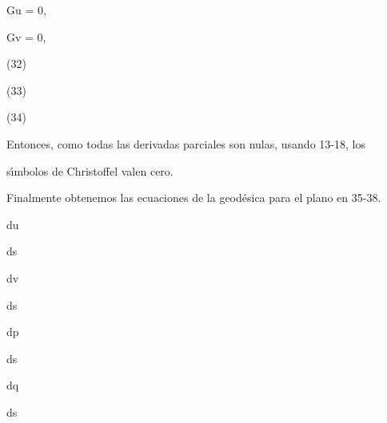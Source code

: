 \documentclass[a4paper,portrait,12pt]{article}
\begin{document}
\begin{flushleft}
Gu = 0,
\end{flushleft}


\begin{flushleft}
Gv = 0,
\end{flushleft}





(32)


(33)


(34)





\begin{flushleft}
Entonces, como todas las derivadas parciales son nulas, usando 13-18, los
\end{flushleft}


\begin{flushleft}
s\i{}́mbolos de Christoffel valen cero.
\end{flushleft}


\begin{flushleft}
Finalmente obtenemos las ecuaciones de la geodésica para el plano en 35-38.
\end{flushleft}


\begin{flushleft}
du
\end{flushleft}


\begin{flushleft}
ds
\end{flushleft}


\begin{flushleft}
dv
\end{flushleft}


\begin{flushleft}
ds
\end{flushleft}


\begin{flushleft}
dp
\end{flushleft}


\begin{flushleft}
ds
\end{flushleft}


\begin{flushleft}
dq
\end{flushleft}


\begin{flushleft}
ds
\end{flushleft}
\end{document}
